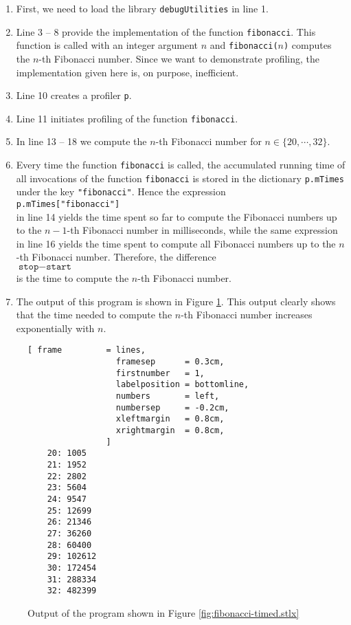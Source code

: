 \begin{enumerate}
\item First, we need to load the library \texttt{debugUtilities} in line 1.
\item Line 3 -- 8 provide the implementation of the function \texttt{fibonacci}.  This function is
      called with an integer argument $n$ and \texttt{fibonacci($n$)} computes the $n$-th Fibonacci
      number.  Since we want to demonstrate profiling, the implementation given here is, on purpose,
      inefficient.  
\item Line 10 creates a profiler \texttt{p}.
\item Line 11 initiates profiling of the function \texttt{fibonacci}.
\item In line 13 -- 18 we compute the $n$-th Fibonacci number for $n \in \{20, \cdots, 32\}$.
\item Every time the function \texttt{fibonacci} is called, the accumulated running time of all
      invocations of the function \texttt{fibonacci} is stored in the dictionary \texttt{p.mTimes}
      under the key \texttt{"fibonacci"}.  Hence the expression 
      \\[0.2cm]
      \hspace*{1.3cm}
      \texttt{p.mTimes["fibonacci"]}
      \\[0.2cm]
      in line 14 yields the time spent so far to compute the Fibonacci numbers up to the
      $n\!-\!1$-th Fibonacci number in milliseconds, while the same expression in line 16 yields the
      time spent to compute all Fibonacci numbers up to the $n$-th Fibonacci number.  Therefore,
      the difference 
      \\[0.2cm]
      \hspace*{1.3cm}
      $\texttt{stop}-\texttt{start}$ 
      \\[0.2cm]
      is the time to compute the $n$-th Fibonacci number.
\item The output of this program is shown in Figure \ref{fig:fibonacci-timed-out}.  This output
      clearly shows that the time needed to compute the $n$-th Fibonacci number increases
      exponentially with $n$.
\end{enumerate}

\begin{figure}[!ht]
\centering
\begin{Verbatim}[ frame         = lines, 
                  framesep      = 0.3cm, 
                  firstnumber   = 1,
                  labelposition = bottomline,
                  numbers       = left,
                  numbersep     = -0.2cm,
                  xleftmargin   = 0.8cm,
                  xrightmargin  = 0.8cm,
                ]
    20: 1005
    21: 1952
    22: 2802
    23: 5604
    24: 9547
    25: 12699
    26: 21346
    27: 36260
    28: 60400
    29: 102612
    30: 172454
    31: 288334
    32: 482399
\end{Verbatim}
\vspace*{-0.3cm}
\caption{Output of the program shown in Figure \ref{fig:fibonacci-timed.stlx}}
\label{fig:fibonacci-timed-out}
\end{figure}

